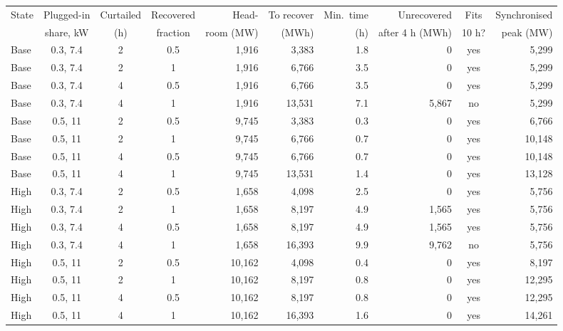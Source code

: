 \begin{tabular}{@{}lcccrrrrcr@{}}
\toprule
State & Plugged-in & Curtailed & Recovered & Head- & To recover & Min.\ time & Unrecovered & Fits & Synchronised \\
 & share, kW & (h) & fraction & room (MW) & (MWh) & (h) & after 4 h (MWh) & 10 h? & peak (MW) \\
\midrule
Base & 0.3, 7.4 & 2 & 0.5 & 1,916 & 3,383 & 1.8 & 0 & yes & 5,299 \\
Base & 0.3, 7.4 & 2 & 1 & 1,916 & 6,766 & 3.5 & 0 & yes & 5,299 \\
Base & 0.3, 7.4 & 4 & 0.5 & 1,916 & 6,766 & 3.5 & 0 & yes & 5,299 \\
Base & 0.3, 7.4 & 4 & 1 & 1,916 & 13,531 & 7.1 & 5,867 & no & 5,299 \\
Base & 0.5, 11 & 2 & 0.5 & 9,745 & 3,383 & 0.3 & 0 & yes & 6,766 \\
Base & 0.5, 11 & 2 & 1 & 9,745 & 6,766 & 0.7 & 0 & yes & 10,148 \\
Base & 0.5, 11 & 4 & 0.5 & 9,745 & 6,766 & 0.7 & 0 & yes & 10,148 \\
Base & 0.5, 11 & 4 & 1 & 9,745 & 13,531 & 1.4 & 0 & yes & 13,128 \\
High & 0.3, 7.4 & 2 & 0.5 & 1,658 & 4,098 & 2.5 & 0 & yes & 5,756 \\
High & 0.3, 7.4 & 2 & 1 & 1,658 & 8,197 & 4.9 & 1,565 & yes & 5,756 \\
High & 0.3, 7.4 & 4 & 0.5 & 1,658 & 8,197 & 4.9 & 1,565 & yes & 5,756 \\
High & 0.3, 7.4 & 4 & 1 & 1,658 & 16,393 & 9.9 & 9,762 & no & 5,756 \\
High & 0.5, 11 & 2 & 0.5 & 10,162 & 4,098 & 0.4 & 0 & yes & 8,197 \\
High & 0.5, 11 & 2 & 1 & 10,162 & 8,197 & 0.8 & 0 & yes & 12,295 \\
High & 0.5, 11 & 4 & 0.5 & 10,162 & 8,197 & 0.8 & 0 & yes & 12,295 \\
High & 0.5, 11 & 4 & 1 & 10,162 & 16,393 & 1.6 & 0 & yes & 14,261 \\
\bottomrule
\end{tabular}
